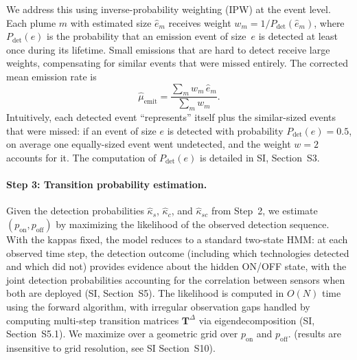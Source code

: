 \documentclass[unnumsec,webpdf,modern,mediumone]{oup-authoring-template}
\begin{document}
We address this using inverse-probability weighting (IPW) at the event level. Each plume $m$ with estimated size $\hat{e}_m$ receives weight $w_m = 1/P_{\text{det}}(\hat{e}_m)$, where $P_{\text{det}}(e)$ is the probability that an emission event of size~$e$ is detected at least once during its lifetime. Small emissions that are hard to detect receive large weights, compensating for similar events that were missed entirely. The corrected mean emission rate is
\begin{equation}
    \hat{\mu}_{\text{emit}}
    = \frac{\sum_m w_m \,\hat{e}_m}{\sum_m w_m}.
    \label{eq:ipw}
\end{equation}
Intuitively, each detected event ``represents'' itself plus the similar-sized events that were missed: if an event of size $e$ is detected with probability $P_{\text{det}}(e) = 0.5$, on average one equally-sized event went undetected, and the weight $w = 2$ accounts for it. The computation of $P_{\text{det}}(e)$ is detailed in SI, Section~S3.

\paragraph{Step 3: Transition probability estimation.}
Given the detection probabilities $\hat{\kappa}_s$, $\hat{\kappa}_c$, and $\hat{\kappa}_{sc}$ from Step~2, we estimate $(p_{\text{on}}, p_{\text{off}})$ by maximizing the likelihood of the observed detection sequence. With the kappas fixed, the model reduces to a standard two-state HMM: at each observed time step, the detection outcome (including which technologies detected and which did not) provides evidence about the hidden ON/OFF state, with the joint detection probabilities accounting for the correlation between sensors when both are deployed (SI, Section~S5). The likelihood is computed in $O(N)$ time using the forward algorithm, with irregular observation gaps handled by computing multi-step transition matrices $\mathbf{T}^{\Delta}$ via eigendecomposition (SI, Section~S5.1). We maximize over a geometric grid over $p_\text{on}$ and $p_\text{off}$.
(results are insensitive to grid resolution, see SI Section~S10).
\end{document}
